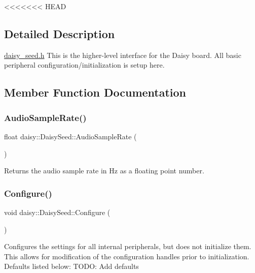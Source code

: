 \begin{DoxyCompactItemize}
<<<<<<< HEAD
\subsection{Detailed Description}
\hyperlink{daisy__seed_8h_source}{daisy\+\_\+seed.\+h} This is the higher-\/level interface for the Daisy board. All basic peripheral configuration/initialization is setup here. 

\subsection{Member Function Documentation}
\mbox{\label{classdaisy_1_1_daisy_seed_a4e95aadd1c473237e45c1882a140fc33}} 
\subsubsection{\texorpdfstring{Audio\+Sample\+Rate()}{AudioSampleRate()}}
{\footnotesize\ttfamily float daisy\+::\+Daisy\+Seed\+::\+Audio\+Sample\+Rate (\begin{DoxyParamCaption}{ }\end{DoxyParamCaption})}

Returns the audio sample rate in Hz as a floating point number. \mbox{\label{classdaisy_1_1_daisy_seed_a756338e5ffbd605a56930d1e634d30e6}} 
\subsubsection{\texorpdfstring{Configure()}{Configure()}}
{\footnotesize\ttfamily void daisy\+::\+Daisy\+Seed\+::\+Configure (\begin{DoxyParamCaption}{ }\end{DoxyParamCaption})}

Configures the settings for all internal peripherals, but does not initialize them. This allows for modification of the configuration handles prior to initialization. Defaults listed below\+: T\+O\+DO\+: Add defaults \mbox{\label{classdaisy_1_1_daisy_seed_a0b123a4bc00a936e3d78ca2ab4aa2773}} 

\end{DoxyCompactItemize}
